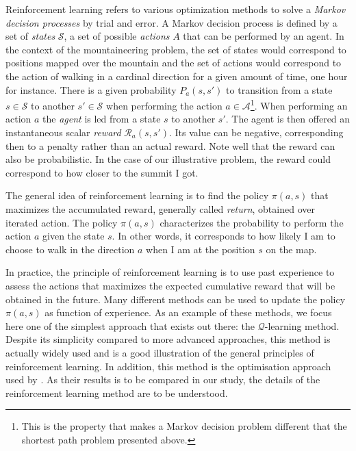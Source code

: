 Reinforcement learning refers to various optimization methods to solve a \textit{Markov decision processes} by trial and error. 
A Markov decision process is defined by a set of \textit{states} $\mathcal{S}$, a set of possible \textit{actions} $A$ that can be performed by an agent.
In the context of the mountaineering problem, the set of states would correspond to positions mapped over the mountain and the set of actions would correspond to the action of walking in a cardinal direction for a given amount of time, one hour for instance.
There is a given probability $P_a(s, s')$ to transition from a state $s \in \mathcal{S}$ to another $s' \in \mathcal{S}$ when performing the action $a \in \mathcal{A}$\footnote{This is the property that makes a Markov decision problem different that the shortest path problem presented above.}.
When performing an action $a$ the \textit{agent} is led from a state $s$ to another $s'$.
The agent is then offered an instantaneous scalar \textit{reward} $\mathcal{R}_a(s, s')$.
Its value can be negative, corresponding then to a penalty rather than an actual reward.
Note well that the reward can also be probabilistic.
In the case of our illustrative problem, the reward could correspond to how closer to the summit I got.

The general idea of reinforcement learning is to find the policy $\pi(a, s)$ that maximizes the accumulated reward, generally called \textit{return}, obtained over iterated action.
The policy $\pi(a, s)$ characterizes the probability to perform the action $a$ given the state $s$.
In other words, it corresponds to how likely I am to choose to walk in the direction $a$ when I am at the position $s$ on the map.

In practice, the principle of reinforcement learning is to use past experience to assess the actions that maximizes the expected cumulative reward that will be obtained in the future.
Many different methods can be used to update the policy $\pi(a, s)$ as function of experience.
As an example of these methods, we focus here one of the simplest approach that exists out there: the $\mathcal{Q}$-learning method.
Despite its simplicity compared to more advanced approaches, this method is actually widely used and is a good illustration of the general principles of reinforcement learning.
In addition, this method is the optimisation approach used by \citep{alageshan2020machine}.
As their results is to be compared in our study, the details of the reinforcement learning method are to be understood. 

